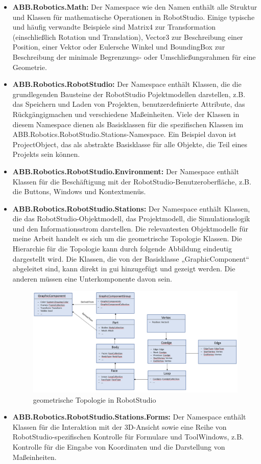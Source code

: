 \documentclass[14pt,a4paper,titlepage]{article}
\begin{document}
			\begin{itemize}
				\item
				\textbf{ABB.Robotics.Math:}
				Der Namespace wie den Namen enthält alle Struktur und Klassen für mathematische Operationen in RobotStudio. Einige typische und häufig verwandte Beispiele sind Matrix4 zur Transformation (einschließlich Rotation und Translation), Vector3 zur Beschreibung einer Position, einer Vektor oder Eulersche Winkel und BoundingBox zur Beschreibung der minimale Begrenzungs- oder Umschließungsrahmen für eine Geometrie. 
				
				\item
				\textbf{ABB.Robotics.RobotStudio:}
				Der Namespace enthält Klassen, die die grundlegenden Bausteine der RobotStudio Pojektmodellen darstellen, z.B. das Speichern und Laden von Projekten, benutzerdefinierte Attribute, das Rückgängigmachen und verschiedene Maßeinheiten. Viele der Klassen in diesem Namespace dienen als Basisklassen für die spezifischen Klassen im ABB.Robotics.RobotStudio.Stations-Namespace. Ein Beispiel davon ist ProjectObject, das als abstrakte Basisklasse für alle Objekte, die Teil eines Projekts sein können.
				
				\item
				\textbf{ABB.Robotics.RobotStudio.Environment:}
				Der Namespace enthält Klassen für die Beschäftigung mit der RobotStudio-Benutzeroberfläche, z.B. die Buttons, Windows und Kontextmenüs.
				
				\item
				\textbf{ABB.Robotics.RobotStudio.Stations:}
				Der Namespace enthält Klassen, die das RobotStudio-Objektmodell, das Projektmodell, die Simulationslogik und den Informationsstrom darstellen. Die relevantesten Objektmodelle für meine Arbeit handelt es sich um die geometrische Topologie Klassen. Die Hierarchie für die Topologie kann durch folgende Abbildung eindeutig dargestellt wird. Die Klassen, die von der Basisklasse „GraphicComponent“ abgeleitet sind, kann direkt in \ac{gui} hinzugefügt und gezeigt werden. Die anderen müssen eine Unterkomponente davon sein. 

				\begin{figure}[h!]
					\centering
					\includegraphics[width=0.8\linewidth]{TopologyRobotStudio.png}
					\caption{geometrische Topologie in RobotStudio}
				\end{figure}
				\item
				\textbf{ABB.Robotics.RobotStudio.Stations.Forms:}
				Der Namespace enthält Klassen für die Interaktion mit der 3D-Ansicht sowie eine Reihe von RobotStudio-spezifischen Kontrolle für Formulare und ToolWindows, z.B. Kontrolle für die Eingabe von Koordinaten und die Darstellung von Maßeinheiten.
			\end{itemize}
\end{document}
